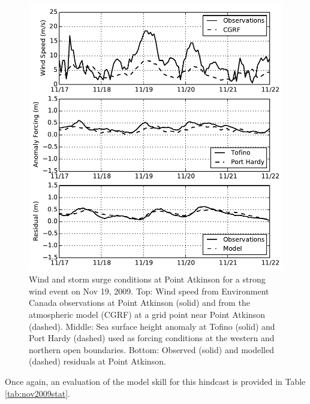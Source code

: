 \documentclass[pdftex,10pt]{article}
\begin{document}
\begin{figure}
\centering
\includegraphics[scale=0.6]{Figures/nov2009.pdf}
\caption{Wind and storm surge conditions at Point Atkinson for a strong wind event on Nov 19, 2009. Top: Wind speed from Environment Canada observations at Point Atkinson (solid) and from the atmospheric model (CGRF) at a grid point near Point Atkinson (dashed). Middle: Sea surface height anomaly at Tofino (solid) and Port Hardy (dashed) used as forcing conditions at the western and northern open boundaries. Bottom: Observed (solid) and modelled (dashed) residuals at Point Atkinson.  }
\label{fig:nov2009}
\end{figure}

Once again, an evaluation of the model skill for this hindcast is provided in Table \ref{tab:nov2009stat}.
\end{document}

